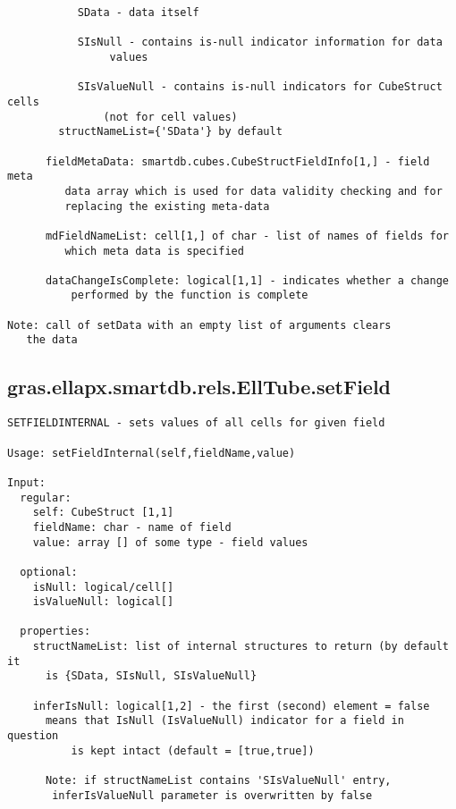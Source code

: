\begin{verbatim}
           SData - data itself

           SIsNull - contains is-null indicator information for data
                values

           SIsValueNull - contains is-null indicators for CubeStruct cells
               (not for cell values)
        structNameList={'SData'} by default

      fieldMetaData: smartdb.cubes.CubeStructFieldInfo[1,] - field meta
         data array which is used for data validity checking and for
         replacing the existing meta-data

      mdFieldNameList: cell[1,] of char - list of names of fields for
         which meta data is specified

      dataChangeIsComplete: logical[1,1] - indicates whether a change
          performed by the function is complete

Note: call of setData with an empty list of arguments clears
   the data
\end{verbatim}
\subsection{\texorpdfstring{gras.ellapx.smartdb.rels.EllTube.setField}{setField}}\label{method:gras.ellapx.smartdb.rels.EllTube.setField}
\begin{verbatim}
SETFIELDINTERNAL - sets values of all cells for given field

Usage: setFieldInternal(self,fieldName,value)

Input:
  regular:
    self: CubeStruct [1,1]
    fieldName: char - name of field
    value: array [] of some type - field values

  optional:
    isNull: logical/cell[]
    isValueNull: logical[]

  properties:
    structNameList: list of internal structures to return (by default it
      is {SData, SIsNull, SIsValueNull}

    inferIsNull: logical[1,2] - the first (second) element = false
      means that IsNull (IsValueNull) indicator for a field in question
          is kept intact (default = [true,true])

      Note: if structNameList contains 'SIsValueNull' entry,
       inferIsValueNull parameter is overwritten by false
\end{verbatim}
